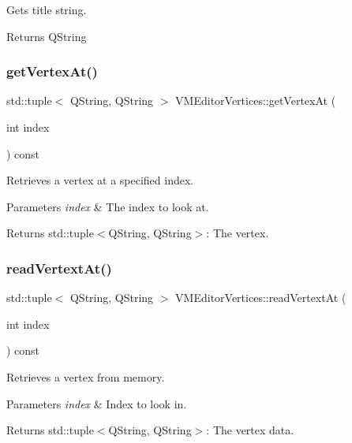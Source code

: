 Gets title string. 

\begin{DoxyReturn}{Returns}
Q\+String 
\end{DoxyReturn}
\mbox{\label{class_v_m_editor_vertices_a1fce7e9467a432c63700f889ab8d6d59}} 
\subsubsection{\texorpdfstring{getVertexAt()}{getVertexAt()}}
{\footnotesize\ttfamily std\+::tuple$<$ Q\+String, Q\+String $>$ V\+M\+Editor\+Vertices\+::get\+Vertex\+At (\begin{DoxyParamCaption}\item[{int}]{index }\end{DoxyParamCaption}) const}



Retrieves a vertex at a specified index. 


\begin{DoxyParams}{Parameters}
{\em index} & The index to look at. \\
\hline
\end{DoxyParams}
\begin{DoxyReturn}{Returns}
std\+::tuple$<$\+Q\+String, Q\+String$>$\+: The vertex. 
\end{DoxyReturn}
\mbox{\label{class_v_m_editor_vertices_a3629c7c6ec4cdc153bc12bed2f1504e8}} 
\subsubsection{\texorpdfstring{readVertextAt()}{readVertextAt()}}
{\footnotesize\ttfamily std\+::tuple$<$ Q\+String, Q\+String $>$ V\+M\+Editor\+Vertices\+::read\+Vertext\+At (\begin{DoxyParamCaption}\item[{int}]{index }\end{DoxyParamCaption}) const}



Retrieves a vertex from memory. 


\begin{DoxyParams}{Parameters}
{\em index} & Index to look in. \\
\hline
\end{DoxyParams}
\begin{DoxyReturn}{Returns}
std\+::tuple$<$\+Q\+String, Q\+String$>$\+: The vertex data. 
\end{DoxyReturn}
\mbox{\label{class_v_m_editor_vertices_a5f1f8f3172ff525863df9bd619d57001}} 
